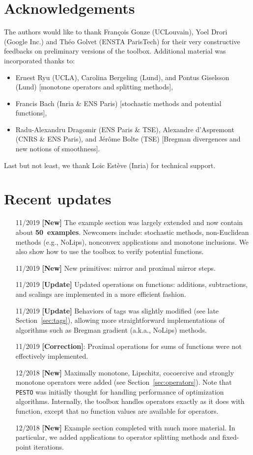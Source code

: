 \documentclass[11pt,a4paper]{article}
\begin{document}
\section*{Acknowledgements}
The authors would like to thank Fran\c{c}ois Gonze (UCLouvain), Yoel Drori (Google Inc.) and Th\'eo Golvet (ENSTA ParisTech) for their very constructive feedbacks on preliminary versions of the toolbox.
Additional material was incorporated thanks to:
\begin{itemize}
	\item Ernest Ryu (UCLA), Carolina Bergeling (Lund), and Pontus Giselsson (Lund) [monotone operators and splitting methods],
	\item Francis Bach (Inria \& ENS Paris) [stochastic methods and potential functions],
	\item Radu-Alexandru Dragomir (ENS Paris \& TSE), Alexandre d'Aspremont (CNRS \& ENS Paris), and J\'er\^ome Bolte (TSE) [Bregman divergences and new notions of smoothness].	
\end{itemize}
Last but not least, we thank Loic Est\`eve (Inria) for technical support.

\section*{Recent updates}
\begin{itemize}
	\item[11/2019] {\bf{}[New]} The example section was largely extended and now contain about {\bf 50~examples}. Newcomers include:  stochastic methods, non-Euclidean methods (e.g., NoLips), nonconvex applications and monotone inclusions. We also show how to use the toolbox to verify potential functions.
	\item[11/2019] {\bf{}[New]} New primitives: mirror and proximal mirror steps.
	\item[11/2019] {\bf{}[Update]} Updated operations on functions: additions, subtractions, and scalings are implemented in a more efficient fashion.
	\item[11/2019] {\bf{}[Update]} Behaviors of tags was slightly modified (see late Section~\ref{sec:tags}), allowing more straightforward implementations of algorithms such as Bregman gradient (a.k.a., NoLips) methods.
	\item[11/2019] {\bf{}[Correction]}: Proximal operations for sums of functions were not effectively implemented.
	\item[12/2018] {\bf{}[New]} Maximally monotone, Lipschitz, cocoercive and strongly monotone operators were added (see Section~\ref{sec:operators}). Note that \verb|PESTO| was initially thought for handling performance of optimization algorithms. Internally, the toolbox handles operators exactly as it does with function, except that no function values are available for operators.
	\item[12/2018] {\bf{}[New]} Example section completed with much more material. In particular, we added applications to operator splitting methods and fixed-point iterations.
\end{itemize}
\end{document}
